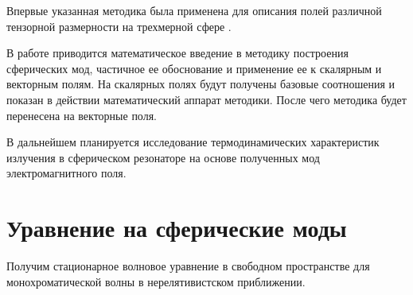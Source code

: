 \documentclass[12pt,a4paper]{article}
\begin{document}
        Впервые указанная методика была применена для описания полей различной тензорной размерности на трехмерной сфере \cite{burlankov_tmf}.

        В работе приводится математическое введение в методику построения сферических мод, частичное ее обоснование и применение ее к скалярным и векторным полям. На скалярных полях будут получены базовые соотношения и показан в действии математический аппарат методики. После чего методика будет перенесена на векторные поля.

        В дальнейшем планируется исследование термодинамических характеристик излучения в сферическом резонаторе на основе полученных мод электромагнитного поля.


    \section{Уравнение на сферические моды}

        Получим стационарное волновое уравнение в свободном пространстве для монохроматической волны в нерелятивистском приближении.
\end{document}
